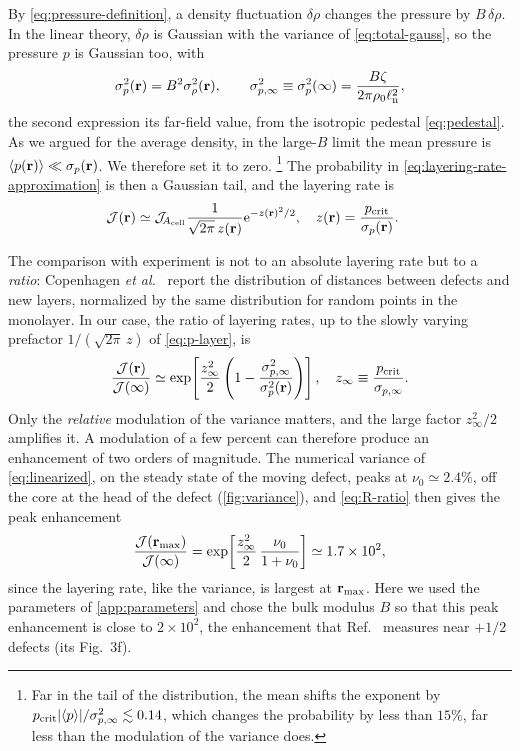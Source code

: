 \documentclass[aps,pre,reprint,superscriptaddress,longbibliography,nofootinbib
]{revtex4-2}
\begin{document}
By \cref{eq:pressure-definition}, a density fluctuation
$\delta\rho$ changes the pressure by $B\,\delta\rho$. In
the linear theory, $\delta\rho$ is Gaussian with the
variance of \cref{eq:total-gauss}, so the pressure $p$ is
Gaussian too, with
\begin{equation}
    \label{eq:sigma-p}
    \sigma_p^2(\mathbf{r}) = B^2\sigma_\rho^2(\mathbf{r}),
    \qquad
    \sigma_{p,\infty}^2 \equiv\sigma_p^2(\infty)= \frac{B\zeta}{2\pi\rho_0\ell_{\rm n}^2},
\end{equation}
the second expression its far-field value, from the
isotropic pedestal \cref{eq:pedestal}. As we argued for the
average density, in the large-$B$ limit the mean pressure
is $\langle p(\mathbf{r}) \rangle \ll \sigma_p(\mathbf{r})$. We therefore
set it to zero.%
\footnote{Far in the tail of the distribution, the mean
shifts the exponent by $p_{\rm crit}|\langle
p\rangle|/\sigma_{p,\infty}^2\lesssim0.14$, which changes
the probability by less than $15\%$, far less than the
modulation of the variance does.} The probability in
\cref{eq:layering-rate-approximation} is then a Gaussian
tail, and the layering rate is
\begin{align}
    \label{eq:p-layer}
    \mathcal{J}(\mathbf{r}) &\simeq\mathcal{J}_{\!{A_{\rm cell}}} \frac1{\sqrt{2\pi}\,z(\mathbf{r})}\mathrm{e}^{-z(\mathbf{r})^2/2},
    \quad
    z(\mathbf{r})= \frac{p_{\rm crit}}{\sigma_p(\mathbf{r})}.
\end{align}


The comparison with experiment is not to an absolute
layering rate but to a \emph{ratio}: Copenhagen \textit{et
al.}~\cite{copenhagen2021} report the distribution of
distances between defects and new layers, normalized by the
same distribution for random points in the monolayer. In
our case, the ratio of layering rates, up to the slowly
varying prefactor $1/(\sqrt{2\pi}\,z)$ of
\cref{eq:p-layer}, is
\begin{equation}
    \label{eq:R-ratio}
    \frac{\mathcal{J}(\mathbf{r})}{\mathcal{J}(\infty)} \simeq
    \exp\!\left[\frac{z_\infty^2}2\left(1-\frac{\sigma_{p,\infty}^2}{\sigma_p^2(\mathbf{r})}\right)\right],
    \quad z_\infty \equiv \frac{p_{\rm crit}}{\sigma_{p,\infty}}.
\end{equation}
Only the \emph{relative} modulation of the variance
matters, and the large factor $z_\infty^2/2$ amplifies it.
A modulation of a few percent can therefore produce an
enhancement of two orders of magnitude. The numerical
variance of \cref{eq:linearized}, on the steady state of
the moving defect, peaks at $\nu_0\simeq2.4\%$, off the
core at the head of the defect (\cref{fig:variance}), and
\cref{eq:R-ratio} then gives the peak enhancement
\begin{equation}
    \label{eq:R-value}
    \frac{\mathcal{J}(\mathbf{r}_\mathrm{max})}{\mathcal{J}(\infty)}
    = \exp\!\left[\frac{z_\infty^2}2\,\frac{\nu_0}{1+\nu_0}\right] \simeq 1.7\times10^2 ,
\end{equation}
since the layering rate, like the variance, is largest at
$\mathbf{r}_\mathrm{max}$. Here we used the parameters of
\cref{app:parameters} and chose the bulk modulus $B$ so
that this peak enhancement is close to $2\times10^2$, the
enhancement that Ref.~\cite{copenhagen2021} measures near
$+1/2$ defects (its Fig.~3f).
\end{document}
